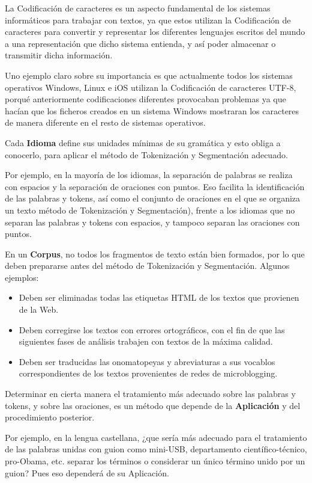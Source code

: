 \documentclass[11pt]{exam}
\begin{document}
\begin{questions}
La Codificación de caracteres es un aspecto fundamental de los sistemas informáticos para trabajar con textos, ya que estos utilizan la Codificación de caracteres para convertir y representar los diferentes lenguajes escritos del mundo a una representación que dicho sistema entienda, y así poder almacenar o transmitir dicha información.

Uno ejemplo claro sobre su importancia es que actualmente todos los sistemas operativos Windows, Linux e iOS utilizan la Codificación de caracteres UTF-8, porqué anteriormente codificaciones diferentes provocaban problemas ya que hacían que los ficheros creados en un sistema Windows mostraran los caracteres de manera diferente en el resto de sistemas operativos. 

Cada {\bf Idioma} define sus unidades mínimas de su gramática y esto obliga a conocerlo, para aplicar el método de Tokenización y Segmentación adecuado.

Por ejemplo, en la mayoría de los idiomas, la separación de palabras se realiza con espacios y la separación de oraciones con puntos. Eso facilita la identificación de las palabras y tokens, así como el conjunto de oraciones en el que se organiza un texto método de Tokenización y Segmentación), frente a los idiomas que no separan las palabras y tokens con espacios, y tampoco separan las oraciones con puntos.

En un {\bf Corpus}, no todos los fragmentos de texto están bien formados, por lo que deben prepararse antes del método de Tokenización y Segmentación. Algunos ejemplos:

\begin{itemize}
	\item Deben ser	eliminadas todas las etiquetas HTML de los textos que provienen de la Web.
	\item Deben corregirse los textos con errores ortográficos, con el fin de que las siguientes fases de análisis trabajen con textos de la máxima calidad.
	\item Deben ser traducidas las onomatopeyas y abreviaturas a sus vocablos correspondientes de los textos provenientes de redes de microblogging. 
\end{itemize}

Determinar en cierta manera el tratamiento más adecuado sobre las palabras y tokens, y sobre las oraciones, es un método que depende de la {\bf Aplicación} y del procedimiento posterior.

Por ejemplo, en la lengua castellana, ¿que sería más adecuado para el tratamiento de las palabras unidas con guion como mini-USB, departamento científico-técnico, pro-Obama, etc. separar los términos o considerar un único término unido por un guion? Pues eso dependerá de su Aplicación.


\end{questions}
\end{document}
